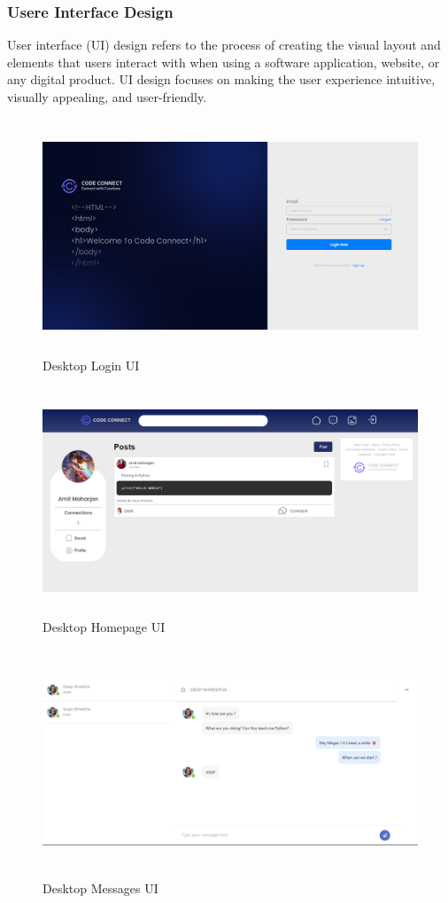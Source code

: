 \subsubsection{Usere Interface Design}
User interface (UI) design refers to the process of creating the visual layout and elements that users interact with when using a software application, website, or any digital product. UI design focuses on making the user experience intuitive, visually appealing, and user-friendly. 
\begin{figure}[H]
    \centering
    \includegraphics[height = 7cm]{ui_diagrams/desktop_login.png}
    \caption{Desktop Login UI}
\end{figure}
\begin{figure}[H]
  \centering
  \includegraphics[height = 6.8cm]{ui_diagrams/desktop_homepage.png}
  \caption{Desktop Homepage UI}
\end{figure}
\begin{figure}[H]
  \centering
  \includegraphics[height = 6.8cm]{ui_diagrams/desktop_messages.png}
  \caption{Desktop Messages UI}
\end{figure}
